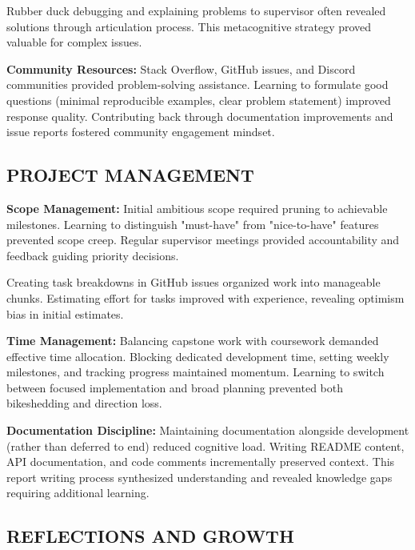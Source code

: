 \documentclass[12pt]{article}
\begin{document}
Rubber duck debugging and explaining problems to supervisor often revealed solutions through articulation process. This metacognitive strategy proved valuable for complex issues.

\hspace{\parindent}\textbf{Community Resources:} Stack Overflow, GitHub issues, and Discord communities provided problem-solving assistance. Learning to formulate good questions (minimal reproducible examples, clear problem statement) improved response quality. Contributing back through documentation improvements and issue reports fostered community engagement mindset.

\subsection{PROJECT MANAGEMENT}

\hspace{\parindent}\textbf{Scope Management:} Initial ambitious scope required pruning to achievable milestones. Learning to distinguish "must-have" from "nice-to-have" features prevented scope creep. Regular supervisor meetings provided accountability and feedback guiding priority decisions.

Creating task breakdowns in GitHub issues organized work into manageable chunks. Estimating effort for tasks improved with experience, revealing optimism bias in initial estimates.

\hspace{\parindent}\textbf{Time Management:} Balancing capstone work with coursework demanded effective time allocation. Blocking dedicated development time, setting weekly milestones, and tracking progress maintained momentum. Learning to switch between focused implementation and broad planning prevented both bikeshedding and direction loss.

\hspace{\parindent}\textbf{Documentation Discipline:} Maintaining documentation alongside development (rather than deferred to end) reduced cognitive load. Writing README content, API documentation, and code comments incrementally preserved context. This report writing process synthesized understanding and revealed knowledge gaps requiring additional learning.

\subsection{REFLECTIONS AND GROWTH}
\end{document}
